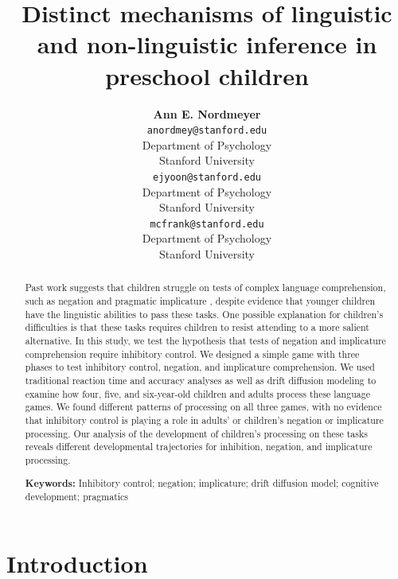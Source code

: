\documentclass[10pt,letterpaper]{article}
\title{Distinct mechanisms of linguistic and non-linguistic inference in preschool children}
\author{{\large \bf Ann E. Nordmeyer} \\
  \texttt{anordmey@stanford.edu} \\
  Department of Psychology \\
  Stanford University
  \And {\large \bf Erica J. Yoon} \\
  \texttt{ejyoon@stanford.edu} \\
  Department of Psychology \\
  Stanford University
  \And {\large \bf Michael C. Frank} \\
  \texttt{mcfrank@stanford.edu} \\
  Department of Psychology \\
  Stanford University}
\newcommand{\ejy}[1]{\textcolor{Blue}{[ejy: #1]}}
\newcommand{\aen}[1]{\textcolor{DarkOrange}{[aen: #1]}}
\begin{document}
\maketitle


\begin{abstract}

Past work suggests that children struggle on tests of complex language comprehension, such as negation and pragmatic implicature \cite{nordmeyer2014b, yoonchildren}, despite evidence that younger children have the linguistic abilities to pass these tasks.  One possible explanation for children's difficulties is that these tasks requires children to resist attending to a more salient alternative.  In this study, we test the hypothesis that tests of negation and implicature comprehension require inhibitory control.  We designed a simple game with three phases to test inhibitory control, negation, and implicature comprehension. We used traditional reaction time and accuracy analyses as well as drift diffusion modeling to examine how four, five, and six-year-old children and adults process these language games.  We found different patterns of processing on all three games, with no evidence that inhibitory control is playing a role in adults' or children's negation or implicature processing.  Our analysis of the development of children's processing on these tasks reveals different developmental trajectories for inhibition, negation, and implicature processing.

\textbf{Keywords:} 
Inhibitory control; negation; implicature; drift diffusion model; cognitive development; pragmatics

\end{abstract}


\section{Introduction}

%
%
\end{document}
